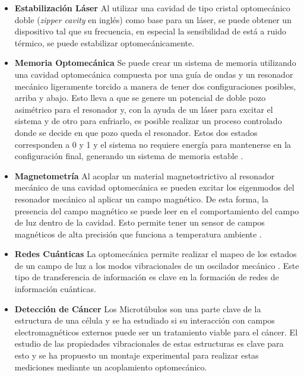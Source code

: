 \documentclass[10pt,a4paper]{report}
\begin{document}
\begin{itemize}

\item \textbf{Estabilización Láser} Al utilizar una cavidad de tipo cristal optomecánico doble (\textit{zipper cavity} en inglés) como base para un láser, se puede obtener un dispositivo tal que su frecuencia, en especial la sensibilidad de está a ruido térmico, se puede estabilizar optomecánicamente\cite{MayerZC}.

\item  \textbf{Memoria Optomecánica} Se puede crear un sistema de memoria utilizando una cavidad optomecánica compuesta por una guía de ondas y un resonador mecánico ligeramente torcido a manera de tener dos configuraciones posibles, arriba y abajo. Esto lleva a que se genere un potencial de doble pozo asimétrico para el resonador y, con la ayuda de un láser para excitar el sistema y de otro para enfriarlo, es posible realizar un proceso controlado donde se decide en que pozo queda el resonador. Estos dos estados corresponden a 0 y 1 y el sistema no requiere energía para mantenerse en la configuración final, generando un sistema de memoria estable \cite{BagheriMM}.

\item \textbf{Magnetometría} Al acoplar un material magnetostrictivo al resonador mecánico de una cavidad optomecánica se pueden excitar los eigenmodos del resonador mecánico al aplicar un campo magnético. De esta forma, la presencia del campo magnético se puede leer en el comportamiento del campo de luz dentro de la cavidad. Esto permite tener un sensor de campos magnéticos de alta precisión que funciona a temperatura ambiente \cite{ForstnerOM}.

\item \textbf{Redes Cuánticas} La optomecánica permite realizar el mapeo de los estados de un campo de luz a los modos vibracionales de un oscilador mecánico \cite{ZhangQST}. Este tipo de transferencia de información es clave en la formación de redes de información cuánticas.\cite{KimbleQI}

\item \textbf{Detección de Cáncer} Los Microtúbulos son una parte clave de la estructura de una célula y se ha estudiado si su interacción con campos electromagnéticos externos puede ser un tratamiento viable para el cáncer\cite{KirsonEMT}. El estudio de las propiedades vibracionales de estas estructuras es clave para esto y se ha propuesto un montaje experimental para realizar estas mediciones mediante un acoplamiento optomecánico\cite{SalariOC}.

\end{itemize} 
\end{document}
